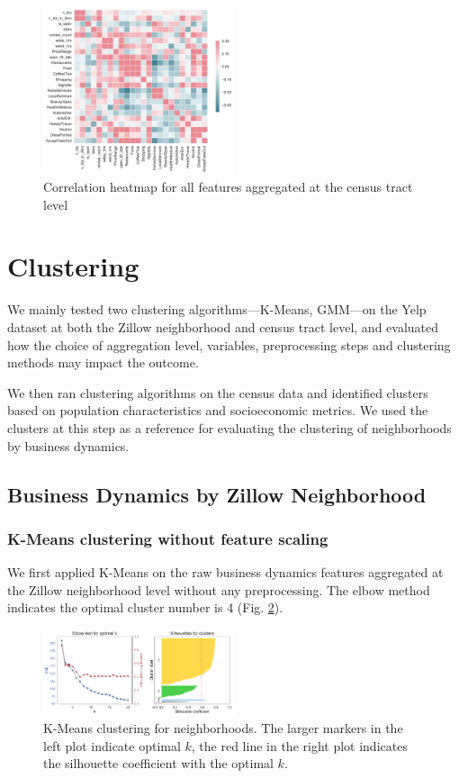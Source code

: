 \documentclass[compsoc]{IEEEtran}
\let\MYoriglatexcaption\caption
\renewcommand{\caption}[2][\relax]{\MYoriglatexcaption[#2]{#2}}
\begin{document}
\begin{figure}[h]
  \hspace{-.5em}
    \includegraphics[width=0.5\textwidth]{nbh-corr}
  \caption{Correlation heatmap for all features aggregated at the census tract level}
  \label{nbh-corr}
\end{figure}

\section{Clustering}

We mainly tested two clustering algorithms---K-Means, GMM---on the Yelp dataset at both the Zillow neighborhood and census tract level, and evaluated how the choice of aggregation level, variables, preprocessing steps and clustering methods may impact the outcome.

We then ran clustering algorithms on the census data and identified clusters based on population characteristics and socioeconomic metrics. We used the clusters at this step as a reference for evaluating the clustering of neighborhoods by business dynamics.

\subsection{Business Dynamics by Zillow Neighborhood}

\subsubsection{K-Means clustering without feature scaling}

We first applied K-Means on the raw business dynamics features aggregated at the Zillow neighborhood level without any preprocessing. The elbow method indicates the optimal cluster number is 4 (Fig. \ref{nbh-kmeans}).

\begin{figure}[h]
  \hspace{-.5em}
    \includegraphics[width=0.5\textwidth]{nbh-kmeans}
  \caption{K-Means clustering for neighborhoods. The larger markers in the left plot indicate optimal $k$, the red line in the right plot indicates the silhouette coefficient with the optimal $k$.}
  \label{nbh-kmeans}
\end{figure}
\end{document}
